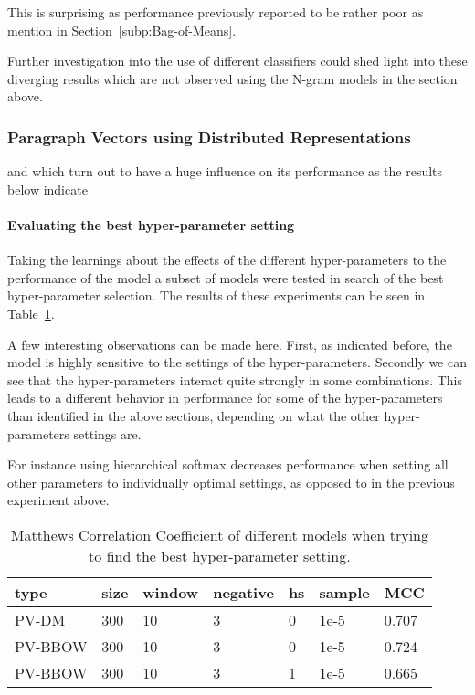 This is surprising as performance previously reported to be rather poor as mention in Section~\ref{subp:Bag-of-Means}.

 Further investigation into the use of different classifiers could shed light into these diverging results which are not observed using the N-gram models in the section above.

\subsubsection{Paragraph Vectors using Distributed Representations}

and which turn out to have a huge influence on its performance as the results below indicate



\paragraph{Evaluating the best hyper-parameter setting}

Taking the learnings about the effects of the different hyper-parameters to the performance of the model a subset of models were tested in search of the best hyper-parameter selection. The results of these experiments can be seen in Table~\ref{tab:Paragraph Vector Parameter Results Best}.

A few interesting observations can be made here. First, as indicated before, the model is highly sensitive to the settings of the hyper-parameters. Secondly we can see that the hyper-parameters interact quite strongly in some combinations. This leads to a different behavior in performance for some of the hyper-parameters than identified in the above sections, depending on what the other hyper-parameters settings are.

For instance using hierarchical softmax decreases performance when setting all other parameters to individually optimal settings, as opposed to in the previous experiment above.

\begin{table}[h]
  \begin{center}
  \begin{tabular}{ *6l | l }
    \toprule
    type & size & window & negative & hs & sample & MCC  \\
    \midrule
    PV-DM & 300 & 10 & 3 & 0 & 1e-5 & 0.707 \\
    PV-BBOW & 300 & 10 & 3 & 0 & 1e-5 & 0.724 \\
    PV-BBOW & 300 & 10 & 3 & 1 & 1e-5 & 0.665 \\
    \bottomrule
  \end{tabular}
  \caption{Matthews Correlation Coefficient of different models when trying to find the best hyper-parameter setting.}
\label{tab:Paragraph Vector Parameter Results Best}
\end{center}
\end{table}



